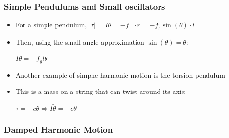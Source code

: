 \documentclass{article}
\begin{document}
\subsubsection*{Simple Pendulums and Small oscillators}

\begin{itemize}
    \item For a simple pendulum, \(|\tau|=I\ddot{\theta}=-f_{\perp}\cdot r = -f_g\sin(\theta)\cdot l\)
    \item Then, using the small angle approximation \(\sin(\theta) = \theta\):
    
    \(I\ddot{\theta}=-f_g l\theta\)
 
    \item Another example of simphe harmonic motion is the torsion pendulum
    \item This is a mass on a string that can twist around its axis:
    
    \(\tau=-c\theta\Rightarrow I\ddot\theta=-c\theta\)
    
\end{itemize}

\subsubsection*{Damped Harmonic Motion}
\end{document}
